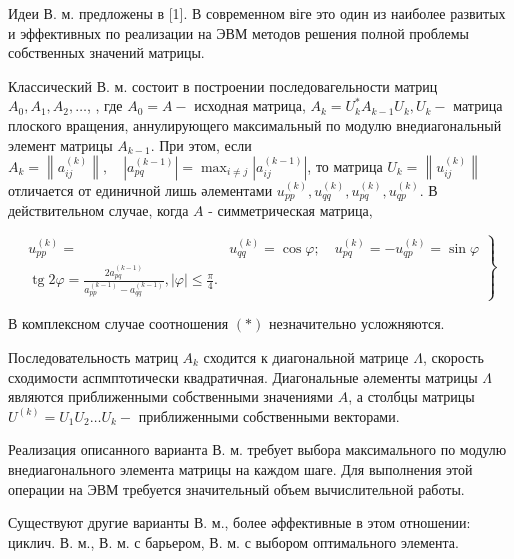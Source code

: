 \documentclass[10pt]{article}
\begin{document}
Идеи В. м. предложены в [1]. В современном віге это один из наиболее развитых и эффективных по реализации на ЭВМ методов решения полной проблемы собственных значений матрицы.



Классический В. м. состоит в построении последовагельности матриц $A_{0}, A_{1}, A_{2}, \ldots$, , где $A_{0}=A-$ исходная матрица, $A_{k}=U_{k}^{*} A_{k-1} U_{k}, U_{k}-$ матрица плоского вращения, аннулирующего максимальный по модулю внедиагональный элемент матрицы $A_{k-1}$. При этом, если $A_{k}=\left\|a_{i j}^{(k)}\right\|, \quad\left|a_{p q}^{(k-1)}\right|=\max _{i \neq j}\left|a_{i j}^{(k-1)}\right|$, то матрица $U_{k}=\left\|u_{i j}^{(k)}\right\|$ отличается от единичной лишь әлементами $u_{p p}^{(k)}, u_{q q}^{(k)}, u_{p q}^{(k)}, u_{q p}^{(k)}$. В действительном случае, когда $A$ - симметрическая матрица,



\[

\left.\begin{array}{rl}

u_{p p}^{(k)}= & u_{q q}^{(k)}=\cos \varphi ; \quad u_{p q}^{(k)}=-u_{q p}^{(k)}=\sin \varphi \\

\operatorname{tg} 2 \varphi=\frac{2 a_{p q}^{(k-1)}}{a_{p p}^{(k-1)}-a_{q q}^{(k-1)}},|\varphi| \leqslant \frac{\pi}{4} .

\end{array}\right\}

\]



В комплексном случае соотношения $(*)$ незначительно усложняются.



Последовательность матриц $A_{k}$ сходится к диагональной матрице $\Lambda$, скорость сходимости аспмптотически квадратичная. Диагональные әлементы матрицы $\Lambda$ являются приближенными собственными значениями $A$, а столбцы матрицы $U^{(k)}=U_{1} U_{2} \ldots U_{k}-$ приближенными собственными векторами.



Реализация описанного варианта В. м. требует выбора максимального по модулю внедиагонального элемента матрицы на каждом шаге. Для выполнения этой операции на ЭВМ требуется значительный объем вычислительной работы.



Существуют другие варианты В. м., более әффективные в этом отношении: циклич. В. м., В. м. с барьером, В. м. с выбором оптимального элемента.
\end{document}

